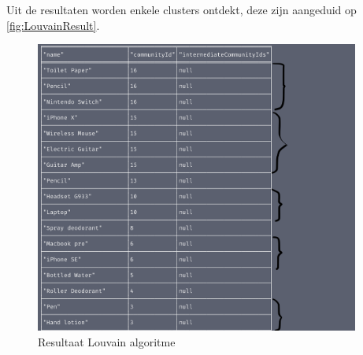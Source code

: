 Uit de resultaten worden enkele clusters ontdekt, deze zijn aangeduid op \autoref{fig:LouvainResult}.

\begin{figure} [ht]
	\centering
	\includegraphics[width=0.95\textwidth]{img/Louvain_result}
	\caption{Resultaat Louvain algoritme}
	\label{fig:LouvainResult}
\end{figure}




